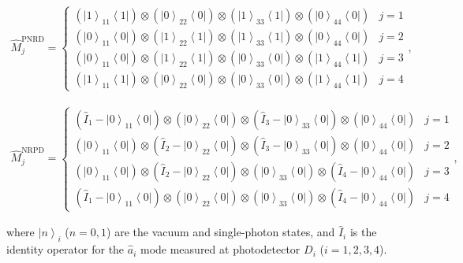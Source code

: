 \documentclass[aps,twocolumn,secnumarabic,amsmath,amssymb,pra,groupedaddress,
showpacs, showkeys,draft]{revtex4-1}
\newcommand{\bra}[1]{\left\langle #1 \right|}
\newcommand{\ket}[1]{\left|#1\right\rangle}
\newcommand{\pna}[1]{\left(#1\right)}
\begin{document}
\begin{widetext}
\begin{align}
    \hat{M}_j^{\textrm{PNRD}} = \left\{
	\begin{array}{lr}
\pna{\ket{1}_{11}\bra{1}}\otimes\pna{\ket{0}_{22}\bra{0}}\otimes\pna{\ket{1}_{33}\bra{1}}\otimes\pna{\ket{0}_{44}\bra{0}} & j=1\\
\pna{\ket{0}_{11}\bra{0}}\otimes\pna{\ket{1}_{22}\bra{1}}\otimes\pna{\ket{1}_{33}\bra{1}}\otimes\pna{\ket{0}_{44}\bra{0}} & j=2\\
\pna{\ket{0}_{11}\bra{0}}\otimes\pna{\ket{1}_{22}\bra{1}}\otimes\pna{\ket{0}_{33}\bra{0}}\otimes\pna{\ket{1}_{44}\bra{1}} & j=3\\
\pna{\ket{1}_{11}\bra{1}}\otimes\pna{\ket{0}_{22}\bra{0}}\otimes\pna{\ket{0}_{33}\bra{0}}\otimes\pna{\ket{1}_{44}\bra{1}} & j=4
	\end{array}
	\right.,
\end{align}


\begin{align}
    \hat{M}_j^{\textrm{NRPD}} = \left\{
	\begin{array}{lr}
\pna{\hat{I}_1-\ket{0}_{11}\bra{0}}\otimes\pna{\ket{0}_{22}\bra{0}}\otimes\pna{\hat{I}_3-\ket{0}_{33}\bra{0}}\otimes\pna{\ket{0}_{44}\bra{0}} & j=1\\
\pna{\ket{0}_{11}\bra{0}}\otimes\pna{\hat{I}_2-\ket{0}_{22}\bra{0}}\otimes\pna{\hat{I}_3-\ket{0}_{33}\bra{0}}\otimes\pna{\ket{0}_{44}\bra{0}} & j=2\\
\pna{\ket{0}_{11}\bra{0}}\otimes\pna{\hat{I}_2-\ket{0}_{22}\bra{0}}\otimes\pna{\ket{0}_{33}\bra{0}}\otimes\pna{\hat{I}_4-\ket{0}_{44}\bra{0}} & j=3\\
\pna{\hat{I}_1-\ket{0}_{11}\bra{0}}\otimes\pna{\ket{0}_{22}\bra{0}}\otimes\pna{\ket{0}_{33}\bra{0}}\otimes\pna{\hat{I}_4-\ket{0}_{44}\bra{0}} & j=4
	\end{array}
	\right.,
	\label{eq:chap3:meas_povm}
\end{align}
\end{widetext}
where $\ket{n}_i$ ($n=0,1$) are the vacuum and single-photon states, and
$\hat{I}_i$ is the identity operator for the $\hat{a}_i$ mode measured at
photodetector $D_i$ ($i=1,2,3,4$).
\end{document}

